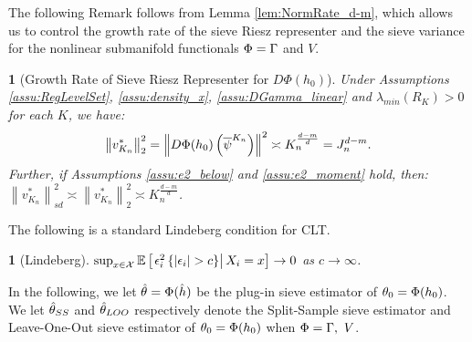 \documentclass[12pt,american]{article}
\theoremstyle{definition}
\theoremstyle{plain}
\newtheorem{assumption}{\protect\assumptionname}
\theoremstyle{definition}
\theoremstyle{plain}
\theoremstyle{plain}
\theoremstyle{plain}
\theoremstyle{plain}
\newtheorem{rem}{\protect\remarkname}
\theoremstyle{plain}
\newcommand{\E}{\mathbb{E}}
\newcommand{\norm}[1]{\left\| #1 \right\|}
\providecommand{\assumptionname}{Assumption}
\providecommand{\remarkname}{Remark}
\providecommand{\assumptionname}{Assumption}
\begin{document}
The following Remark follows from Lemma \ref{lem:NormRate_d-m}, which allows us to control the growth rate of the sieve Riesz representer and the sieve variance for the nonlinear submanifold functionals $\Phi=\Gamma$ and $V$.

\begin{rem}[Growth Rate of Sieve Riesz Representer for $D\Phi(h_0)$]
  \label{rem:NormRate_nonlinear}Under Assumptions \ref{assu:RegLevelSet}, \ref{assu:density_x}, \ref{assu:DGamma_linear} and $\lambda_{min} \left( R_{K}\right) >0$ for each $K$, we have:
  \begin{equation}
    \norm{v_{K_{n}}^{*}}_{2}^{2}=\norm{D\Phi(h_0)\left(\ol \psi^{K_{n}}\right)}^{2}\asymp K_{n}^{\frac{d-m}{d}}=J_{n}^{d-m}.\label{eq:NormRate}
  \end{equation}
  Further, if Assumptions \ref{assu:e2_below} and \ref{assu:e2_moment} hold, then: $\norm{v_{K_{n}}^{*}}_{sd}^2\asymp \norm{v_{K_{n}}^{*}}_{2}^{2} \asymp K_{n}^{\frac{d-m}{d}}$.
\end{rem}

The following is a standard Lindeberg condition for CLT.
\begin{assumption}[Lindeberg]\label{assu:Lindeberg} $\sup_{x\in{\cal X}}\E\left[\rest{\e_{i}^{2}\left\{ \left|\e_{i}\right|>c\right\} }X_{i}=x\right]\to0$
  as $c\to\infty$.
\end{assumption}

In the following, we let $\hat{\theta}=\Phi(\hat{h})$ be the plug-in sieve estimator of $\theta_0=\Phi(h_0)$. We let $\hat{\theta}_{SS}$ and $\hat{\theta}_{LOO}$ respectively denote the Split-Sample sieve estimator and Leave-One-Out sieve estimator of $\theta_0=\Phi (h_0)$ when $\Phi=\Gamma,~V$.
\end{document}
